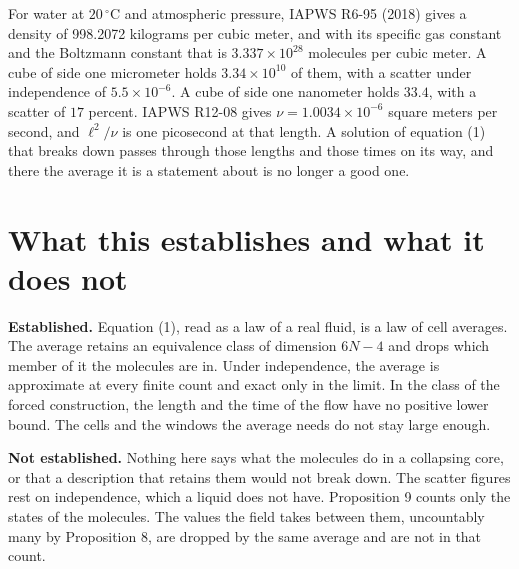 For water at $20\,^\circ$C and atmospheric pressure, IAPWS R6-95 (2018) gives a density of
998.2072 kilograms per cubic meter, and with its specific gas constant and the Boltzmann constant
that is $3.337\times 10^{28}$ molecules per cubic meter. A cube of side one micrometer holds
$3.34\times 10^{10}$ of them, with a scatter under independence of $5.5\times 10^{-6}$. A cube of
side one nanometer holds $33.4$, with a scatter of $17$ percent. IAPWS R12-08 gives
$\nu = 1.0034\times 10^{-6}$ square meters per second, and $\ell^2/\nu$ is one picosecond at that
length. A solution of equation (1) that breaks down passes through
those lengths and those times on its way, and there the average it is a statement about is no
longer a good one.

\section{What this establishes and what it does not}

\textbf{Established.} Equation (1), read as a law of a real fluid, is a law of cell averages. The
average retains an equivalence class of dimension $6N-4$ and drops which member of it the molecules
are in. Under independence, the average is approximate at every finite count and exact only in the
limit. In the class of the forced construction, the length and the time of the flow have no
positive lower bound. The cells and the windows the average needs do not stay large enough.

\textbf{Not established.} Nothing here says what the molecules do in a collapsing core, or that a
description that retains them would not break down. The scatter figures rest on independence, which
a liquid does not have. Proposition 9 counts only the states of the molecules. The values the field
takes between them, uncountably many by Proposition 8, are dropped by the same average and are not
in that count.
